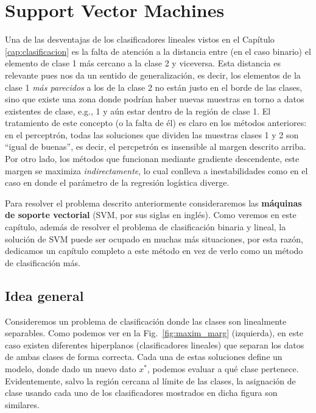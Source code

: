 \section{Support Vector Machines}

Una de las desventajas de los clasificadores lineales vistos en el Capítulo \ref{cap:clasificacion} es la falta de atención a la distancia entre (en el caso binario) el elemento de clase 1 más cercano a la clase 2 y viceversa. Esta distancia es relevante pues nos da un sentido de generalización, es decir,  los elementos de la clase 1  \emph{más parecidos} a los de la clase 2 no están justo en el borde de las clases, sino que existe una zona donde podrían haber nuevas muestras en torno a datos existentes de clase, e.g., 1 y aún estar dentro de la región de clase 1. El tratamiento de este concepto (o la falta de él) es claro en los métodos anteriores: en el perceptrón, todas las soluciones que dividen las muestras clases 1 y 2 son ``igual de buenas'', es decir, el percpetrón es insensible al margen descrito arriba. Por otro lado, los métodos que funcionan mediante gradiente descendente, este margen se maximiza \emph{indirectamente}, lo cual conlleva a inestabilidades como en el caso en donde el parámetro de la regresión logística diverge. 


Para resolver el problema descrito anteriormente consideraremos las \textbf{máquinas de soporte vectorial} (SVM, por sus siglas en inglés). Como veremos en este capítulo, además de resolver el problema de clasificación binaria y lineal, la solución de SVM puede ser ocupado en muchas más situaciones, por esta razón, dedicamos un capítulo completo a este método en vez de verlo como un método de clasificación más. 

\subsection{Idea general}

Consideremos un problema de clasificación donde las clases son linealmente separables. Como podemos ver en la Fig.~\ref{fig:maxim_marg} (izquierda), en este caso existen diferentes hiperplanos (clasificadores lineales) que separan los datos de ambas clases de forma correcta. Cada una de estas soluciones define un modelo, donde dado un nuevo dato $x^*$, podemos evaluar a qué clase pertenece. Evidentemente, salvo la región cercana al límite de las clases, la asignación de clase usando cada uno de los clasificadores mostrados en dicha figura son similares. 


